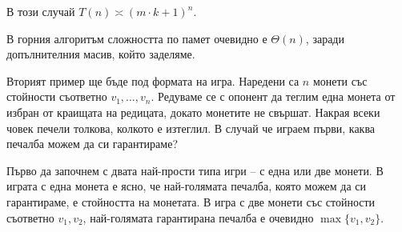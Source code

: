В този случай $T(n) \asymp (m \cdot k + 1)^n$.

В горния алгоритъм сложността по памет очевидно е $\Theta(n)$, заради допълнителния масив, който заделяме.

Вторият пример ще бъде под формата на игра.
Наредени са $n$ монети със стойности съответно $v_1, \dots, v_n$.
Редуваме се с опонент да теглим една монета от избран от краищата на редицата, докато монетите не свършат.
Накрая всеки човек печели толкова, колкото е изтеглил.
В случай че играем първи, каква печалба можем да си гарантираме?

Първо да започнем с двата най-прости типа игри -- с една или две монети.
В играта с една монета е ясно, че най-голямата печалба, която можем да си гарантираме, е стойността на монетата.
В игра с две монети със стойности съответно $v_1, v_2$, най-голямата гарантирана печалба е очевидно $\max \{ v_1, v_2 \}$.

